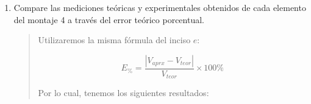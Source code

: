 \documentclass{article}
\begin{document}
\begin{enumerate}[label=\alph*.-]
\begin{quote}
            Note que otra vez es muy sencillo conocer el voltaje de todas las resistencias: debe ser~\SI{8}{\volt}, pues las resistencias están en paralelo a la fuente de dicho valor. Con excepción de la resistencia $R_4$, que tendrá un voltaje de~\SI{10}{\volt}, por tener otra fuente a la par.

            Así pues:

            \begin{align*}
                -I_{V_1} + I_{R_1} + I_{R_2} + I_{R_3} + I_{R_4} &= 0\\
                -I_{V_1} + \frac{V_1}{R_1} + \frac{V_1}{R_2} + \frac{V_1}{R_3} + \frac{V_1 + V_2}{R_4} &= 0\\
                -I_{V_1} + V_1\left(\frac{1}{R_1} + \frac{1}{R_2} + \frac{1}{R_3}\right) + \frac{V_1 + V_2}{R_4} &= 0\\
                I_{V_1} &= 8\left(\frac{1}{120} + \frac{1}{220} + \frac{1}{330}\right) + \frac{10}{470}\\
                I_{V_1} &= 0.06667 + 0.03636 + 0.02424 + 0.02128\\
                I_{V_1} &= 0.14855\\
            \end{align*}

            Por lo que sabemos que la corriente en la fuente de~\SI{8}{\volt} es \SI{148.55}{\milli\ampere}. Y en las resistencias $R_1$, $R_2$, $R_3$ y $R_4$ es aproximadamente \SI{66.67}{\milli\ampere}, \SI{36.36}{\milli\ampere}, \SI{24.24}{\milli\ampere} y \SI{21.28}{\milli\ampere} respectivamente.
        \end{quote}
        
        \item Compare las mediciones teóricas y experimentales obtenidos de cada elemento del montaje 4 a través del error teórico porcentual.
        
        \begin{quote}
            Utilizaremos la misma fórmula del inciso $e$:

            \[
                E_{\%} = \frac{\left|V_{aprx} - V_{teor}\right|}{V_{teor}} \times 100\%
            \]

            Por lo cual, tenemos los siguientes resultados:
            

\end{quote}
\end{enumerate}
\end{document}
